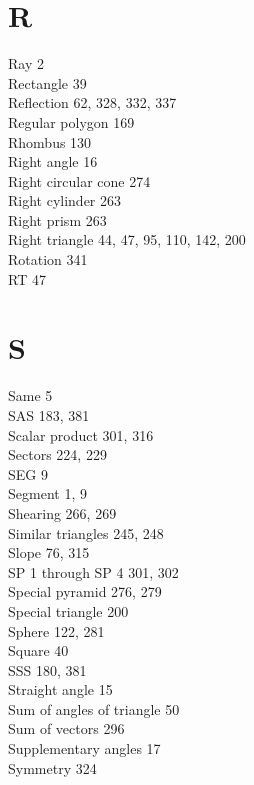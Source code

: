 \documentclass[12pt]{book} %
\begin{document}
\begin{ExerciseList}
\begin{ExerciseList}
\begin{ExerciseList}
\section*{R}
Ray 2\\
Rectangle 39\\
Reflection 62, 328, 332, 337\\
Regular polygon 169\\
Rhombus 130\\
Right angle 16\\
Right circular cone 274\\
Right cylinder 263\\
Right prism 263\\
Right triangle 44, 47, 95, 110, 142, 200\\
Rotation 341\\
RT 47\\

\section*{S}
Same 5\\
SAS 183, 381\\
Scalar product 301, 316\\
Sectors 224, 229\\
SEG 9\\
Segment 1, 9\\
Shearing 266, 269\\
Similar triangles 245, 248\\
Slope 76, 315\\
SP 1 through SP 4 301, 302\\
Special pyramid 276, 279\\
Special triangle 200\\
Sphere 122, 281\\
Square 40\\
SSS 180, 381\\
Straight angle 15\\
Sum of angles of triangle 50\\
Sum of vectors 296\\
Supplementary angles 17\\
Symmetry 324\\


\end{ExerciseList}
\end{ExerciseList}
\end{ExerciseList}
\end{document}
